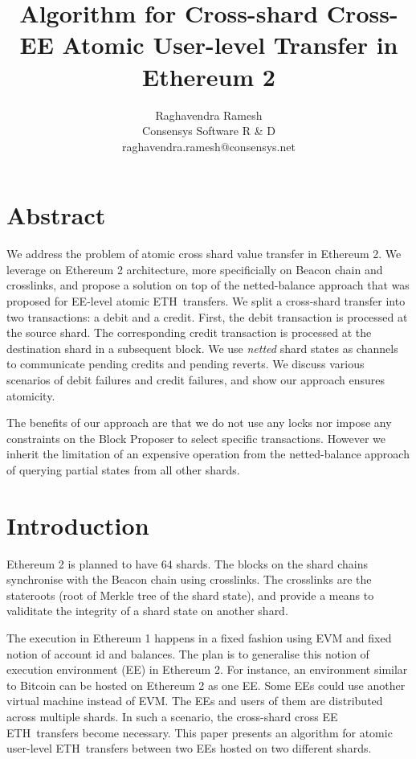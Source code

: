 \documentclass{article}
\title{Algorithm for Cross-shard Cross-EE Atomic User-level \eth Transfer in Ethereum 2}
\author{Raghavendra Ramesh\\Consensys Software R \& D\\raghavendra.ramesh@consensys.net}
\date{}
\newcommand{\eth}[0]{ETH~}
\begin{document}
\maketitle

\section*{Abstract}
We address the problem of atomic cross shard value transfer in Ethereum 2. We leverage on Ethereum 2 architecture, more specificially on Beacon chain and crosslinks, and propose a solution on top of the netted-balance approach that was proposed for EE-level atomic \eth transfers. We split a cross-shard transfer into two transactions: a debit and a credit. First, the debit transaction is processed at the source shard. The corresponding credit transaction is processed at the destination shard in a subsequent block. We use {\em netted} shard states as channels to communicate pending credits and pending reverts. We discuss various scenarios of debit failures and credit failures, and show our approach ensures atomicity. 

The benefits of our approach are that we do not use any locks nor impose any constraints on the Block Proposer to select specific transactions. However we inherit the limitation of an expensive operation from the netted-balance approach of querying partial states from all other shards.

\section{Introduction}

Ethereum 2 is planned to have 64 shards. The blocks on the shard chains synchronise with the Beacon chain using crosslinks. The crosslinks are the stateroots (root of Merkle tree of the shard state), and provide a means to validitate the integrity of a shard state on another shard. 

The execution in Ethereum 1 happens in a fixed fashion using EVM and fixed notion of account id and balances. The plan is to generalise this notion of execution environment (EE) in Ethereum 2. For instance, an environment similar to Bitcoin can be hosted on Ethereum 2 as one EE.  Some EEs could use another virtual machine instead of EVM. The EEs and users of them are distributed across multiple shards. In such a scenario, the cross-shard cross EE \eth transfers become necessary. This paper presents an algorithm for atomic user-level \eth transfers between two EEs hosted on two different shards.
\end{document}
